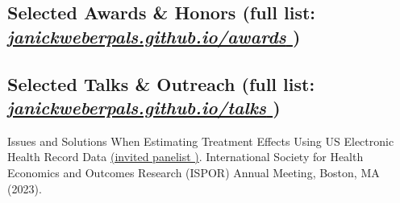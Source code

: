 \documentclass[letterpaper]{twentysecondcv} %
\begin{document}


\subsection{Selected Awards \& Honors \small(full list: \href{https://janickweberpals.github.io/awards}{\textit{janickweberpals.github.io/awards \ExternalLink}})}

\begin{twentyshort} %
\end{twentyshort}


\subsection{Selected Talks \& Outreach \small(full list: \href{https://janickweberpals.github.io/talks}{\textit{janickweberpals.github.io/talks \ExternalLink}})}

Issues and Solutions When Estimating Treatment Effects Using US Electronic Health Record Data \href{https://www.ispor.org/conferences-education/conferences/upcoming-conferences/ispor-2023/program/program/paper/intl2023-3720/15893/316-closing-plenary-issues-and-solutions-when-estimating-treatment-effects-using-us-electronic-health-record-data}{(invited panelist \ExternalLink)}. International Society for Health Economics and Outcomes Research (ISPOR) Annual Meeting, Boston, MA (2023).
\end{document}
